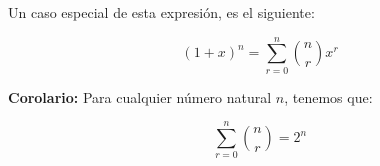 \documentclass[12pt]{article}
\theoremstyle{definition}
\theoremstyle{plain}
\theoremstyle{plain}
\theoremstyle{definition}
\begin{document}
            Un caso especial de esta expresión, es el siguiente:

            \begin{equation*}
                (1+x)^n = \sum_{r=0}^{n} \binom{n}{r} x^r
            \end{equation*}


            \textbf{Corolario:}
            Para cualquier número natural \(n\), tenemos que:

            \begin{equation*}
                \sum_{r=0}^{n} \binom{n}{r} = 2^n
            \end{equation*}


            \newpage
\end{document}
